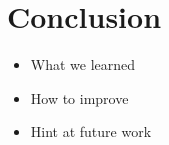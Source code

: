 \section{Conclusion}
\label{s:conclusion}

\begin{itemize}
\item What we learned
\item How to improve
\item Hint at future work
\end{itemize}